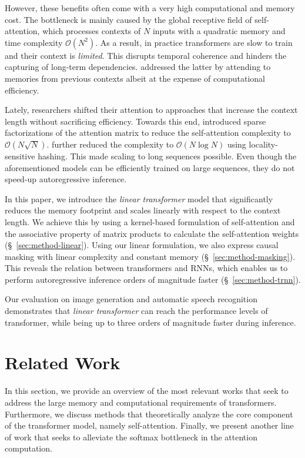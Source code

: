 \documentclass{article}
\newcommand{\linear}{\emph{linear transformer}}
\newcommand{\bigO}[1]{\mathcal{O}\left(#1\right)}
\begin{document}
However, these benefits often come with a very high computational and memory
cost. The bottleneck is mainly caused by the global receptive field of self-attention, which processes
contexts of $N$ inputs with a quadratic memory and time complexity
$\bigO{N^2}$. As a result, in practice transformers are slow to train and their
context is \textit{limited}. This disrupts temporal coherence and hinders the
capturing of long-term dependencies. \citet{dai-etal-2019-transformer}
addressed the latter by attending to memories from previous contexts albeit at
the expense of computational efficiency.

Lately, researchers shifted their attention to approaches that increase the
context length without sacrificing efficiency. Towards this end,
\citet{child2019generating} introduced sparse factorizations of the attention
matrix to reduce the self-attention complexity to $\bigO{N\sqrt{N}}$.
\citet{kitaev2020reformer} further reduced the complexity to $\bigO{N \log N}$
using locality-sensitive hashing. This made scaling to long sequences
possible. Even though the aforementioned models can be efficiently trained on
large sequences, they do not speed-up autoregressive inference.

In this paper, we introduce the \linear{} model that
significantly reduces the memory footprint and scales linearly with respect to
the context length. We achieve this by using a kernel-based formulation of
self-attention and the associative property of matrix products to calculate the
self-attention weights (\S~\ref{sec:method-linear}). Using our linear
formulation, we also express causal masking with linear complexity and constant
memory (\S~\ref{sec:method-masking}). This reveals the relation between
transformers and RNNs, which enables us to perform autoregressive inference
orders of magnitude faster (\S~\ref{sec:method-trnn}).

Our evaluation on image generation and automatic speech recognition
demonstrates that \linear{} can reach the performance levels
of transformer, while being up to three orders of magnitude faster during
inference.

\section{Related Work}

In this section, we provide an overview of the most relevant works that seek to
address the large memory and computational requirements of transformers.
Furthermore, we discuss methods that theoretically analyze the core
component of the transformer model, namely self-attention. Finally, we present
another line of work that seeks to alleviate the softmax bottleneck in the
attention computation.
\end{document}
